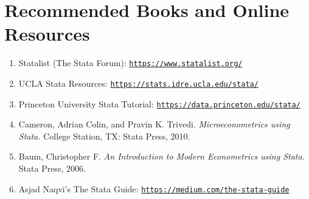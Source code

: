 \documentclass[11pt]{article}
\begin{document}

\section*{Recommended Books and Online Resources}
\begin{enumerate}
\setlength\itemsep{-0.5em}
\item Statalist (The Stata Forum): \href{https://www.statalist.org/}{{\nolinkurl{https://www.statalist.org/}}}
\item UCLA Stata Resources: \href{https://stats.idre.ucla.edu/stata/ }{{\nolinkurl{https://stats.idre.ucla.edu/stata/}}} 
\item Princeton University Stata Tutorial: \href{https://data.princeton.edu/stata/ }{{\nolinkurl{https://data.princeton.edu/stata/}}} 
\item Cameron, Adrian Colin, and Pravin K. Trivedi.  \emph{Microeconometrics using Stata. }College Station, TX: Stata Press,  2010.
\item Baum, Christopher F.  \emph{An Introduction to Modern Econometrics using Stata.} Stata Press,  2006.
\item Asjad Naqvi's The Stata Guide: \href{https://medium.com/the-stata-guide}{{\nolinkurl{https://medium.com/the-stata-guide}}}
\end{enumerate}
\end{document}
